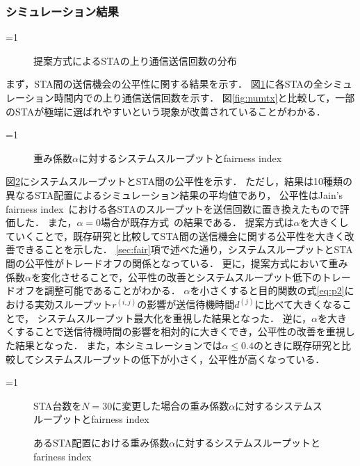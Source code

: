 \documentclass[master]{kuisthesis}		%
\newcommand{\sij}{(i,j)}
\newcommand{\rij}{r^{\sij}}
\newcounter{flagFig}
\begin{document}
		\subsubsection{シミュレーション結果}
			\ifnum\value{flagFig}=1 {\begin{figure}[t]
				\centering
				\caption{提案方式によるSTAの上り通信送信回数の分布}
				\label{fig:fair}
			\end{figure}}\fi
			まず，STA間の送信機会の公平性に関する結果を示す．
			図\ref{fig:fair}に各STAの全シミュレーション時間内での上り通信送信回数を示す．
			図\ref{fig:numtx}と比較して，一部のSTAが極端に選ばれやすいという現象が改善されていることがわかる．
			\par
			\ifnum\value{flagFig}=1 {\begin{figure}[t]
				\centering
				\caption{重み係数$\alpha$に対するシステムスループットとfairness index}
				\label{fig:thr_fair}
			\end{figure}}\fi
			図\ref{fig:thr_fair}にシステムスループットとSTA間の公平性を示す．
			ただし，結果は10種類の異なるSTA配置によるシミュレーション結果の平均値であり，
			公平性はJain's fairness index~\cite{jain}における各STAのスループットを送信回数に置き換えたもので評価した．
			また，$\alpha=0$場合が既存方式~\cite{promac}の結果である．
			提案方式は$\alpha$を大きくしていくことで，既存研究と比較してSTA間の送信機会に関する公平性を大きく改善できることを示した．
			\ref{sec:fair}項で述べた通り，システムスループットとSTA間の公平性がトレードオフの関係となっている．
			更に，提案方式において重み係数$\alpha$を変化させることで，公平性の改善とシステムスループット低下のトレードオフを調整可能であることがわかる．
			$\alpha$を小さくすると目的関数の式\eqref{eq:p2}における実効スループット$\rij$の影響が送信待機時間$d^{(j)}$に比べて大きくなることで，
			システムスループット最大化を重視した結果となった．
			逆に，$\alpha$を大きくすることで送信待機時間の影響を相対的に大きくでき，公平性の改善を重視した結果となった．
			また，本シミュレーションでは$\alpha\leq0.4$のときに既存研究と比較してシステムスループットの低下が小さく，公平性が高くなっている．
			\par
			\ifnum\value{flagFig}=1 {\begin{figure}[t]
				\centering
				\caption{STA台数を$N=30$に変更した場合の重み係数$\alpha$に対するシステムスループットとfairness index}
				\label{fig:chgnum}

				\caption{あるSTA配置における重み係数$\alpha$に対するシステムスループットとfariness index}
				\label{fig:chgtopology}
			\end{figure}}\fi
\end{document}
